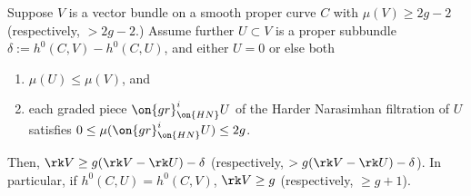 \begin{lemma}
\notready
	\label{lemma:abstract-lower-bound-on-rank}
	Suppose $V$ is a vector bundle on a smooth proper curve $C$ with
	$\mu(V) \geq 2g - 2$ (respectively, $> 2g-2$.)
	Assume further $U \subset V$ is a proper subbundle
	$\delta := h^0(C, V) - h^0(C, U)$,
	and either $U = 0$ or else both
	\begin{enumerate}
		\item 	$\mu(U) \leq \mu(V)$, and
		\item each graded piece
	$\on{gr}^i_{\on{HN}}U$ of the Harder Narasimhan filtration of $U$
	satisfies $0 \leq \mu(\on{gr}^i_{\on{HN}}U) \leq 2g$.
	\end{enumerate}
	Then, $\rk V \geq g (\rk V - \rk U)-\delta$ (respectively, $> g (\rk V - \rk
	U)-\delta$).
	In particular, if
	$h^0(C, U)  = h^0(C, V)$, $\rk V \geq g$ (respectively, $\geq g+1$).
\end{lemma}
